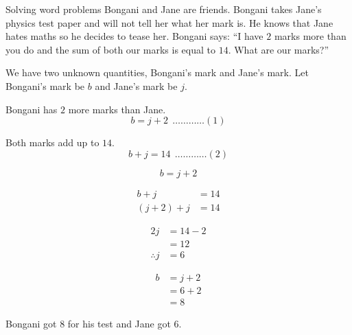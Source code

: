 \begin{wex}{Solving word problems}{%
Bongani and Jane are friends. Bongani takes Jane's physics test paper
and will not tell her what her mark is. He knows that Jane hates maths
so he decides to tease her. Bongani says: ``I have $2$ marks more than
you do and the sum of both our marks is equal to $14$. What are our
marks?''}
{
We have two unknown quantities, Bongani's mark and Jane's mark. Let
Bongani's mark be $b$ and Jane's mark be $j$.

Bongani has $2$ more marks than Jane.
\begin{equation*}
  b=j+2 ~~\ldots \ldots \ldots \ldots (1)
\end{equation*}

Both marks add up to $14$.
\begin{equation*}
  b+j=14 ~~\ldots \ldots \ldots \ldots (2)
\end{equation*}

\begin{equation*}
  b=j+2
\end{equation*}

\begin{align*}
  b+j &= 14 \\
  (j+2)+j &= 14
\end{align*}

\begin{align*}
  2j &= 14 - 2 \\
  &= 12 \\
  \therefore j &= 6
\end{align*}

\begin{align*}
  b &= j+2 \\
  &= 6+2 \\
  &= 8
\end{align*}


Bongani got $8$ for his test and Jane got $6$.
}
\end{wex}

